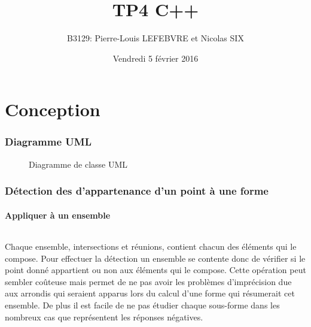 \documentclass[a4paper, 12pts]{article}
\title{TP4 C++}
\author{B3129: Pierre-Louis LEFEBVRE et Nicolas SIX}
\date{Vendredi 5 février 2016}
\begin{document}
\begin{titlepage}

\maketitle

\end{titlepage}


\tableofcontents

\pagebreak



\part{Conception}

\section{Diagramme UML}

\begin{figure}[h]
    \centering
    \caption{Diagramme de classe UML}
    \def\svgwidth{\columnwidth}
    
\end{figure}

\section{Détection des d’appartenance d'un point à une forme}

\subsection{Appliquer à un ensemble}
\paragraph{}
Chaque ensemble, intersections et réunions, contient chacun des éléments qui le compose. Pour effectuer la détection un ensemble se contente donc de vérifier si le point donné appartient ou non aux éléments qui le compose. Cette opération peut sembler coûteuse mais permet de ne pas avoir les problèmes d’imprécision due aux arrondis qui seraient apparus lors du calcul d'une forme qui résumerait cet ensemble. De plus il est facile de ne pas étudier chaque sous-forme dans les nombreux cas que représentent les réponses négatives.
\end{document}
